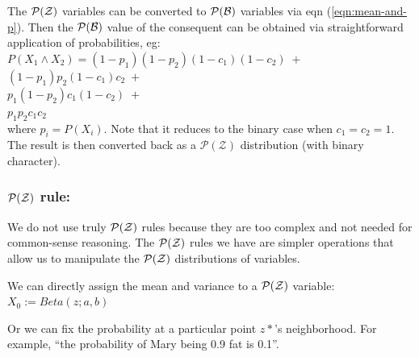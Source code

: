 The $\mathcal{P(Z)}$ variables can be converted to $\mathcal{P(B)}$ variables via eqn (\ref{eqn:mean-and-p}).  Then the $\mathcal{P(B)}$ value of the consequent can be obtained via straightforward application of probabilities, eg:\\
\hspace*{1cm} $ P(X_1 \wedge X_2) = (1-p_1)(1-p_2)(1-c_1)(1-c_2) \; + $ \\
\hspace*{3.5cm} $ (1-p_1)p_2(1-c_1)c_2 \; + $ \\
\hspace*{3.5cm} $ p_1(1-p_2)c_1(1-c_2) \; + $ \\
\hspace*{3.5cm} $ p_1 p_2 c_1 c_2 $ \\
where $p_i = P(X_i)$.  Note that it reduces to the binary case when $c_1 = c_2 = 1$.  The result is then converted back as a $\mathcal{P(Z)}$ distribution (with binary character).

\subsubsection{$\mathcal{P(Z)}$ rule:}

We do not use truly $\mathcal{P(Z)}$ rules because they are too complex and not needed for common-sense reasoning.  The $\mathcal{P(Z)}$ rules we have are simpler operations that allow us to manipulate the $\mathcal{P(Z)}$ distributions of variables.

We can directly assign the mean and variance to a $\mathcal{P(Z)}$ variable:\\
\hspace*{1cm} $X_0 := Beta(z; a, b)$

Or we can fix the probability at a particular point $z*$'s neighborhood.  For example, ``the probability of Mary being 0.9 fat is 0.1''.


%

%

